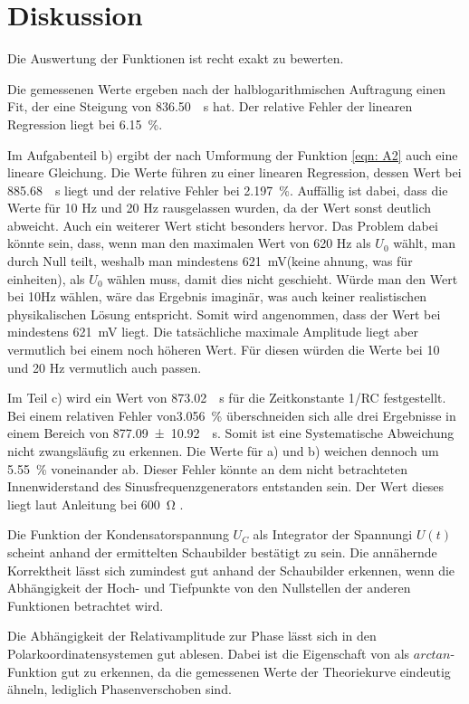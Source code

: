 \section{Diskussion}
\label{sec:Diskussion}

Die Auswertung der Funktionen ist recht exakt zu bewerten. %

Die gemessenen Werte ergeben nach der halblogarithmischen Auftragung einen Fit, der eine Steigung von 
\SI{836.50}{\per\second} hat. Der relative Fehler der linearen Regression liegt bei \SI{6.15}{\percent}. 

Im Aufgabenteil b) ergibt der nach Umformung der Funktion \eqref{eqn: A2}  auch eine lineare Gleichung.
Die Werte führen zu einer linearen Regression, dessen Wert bei \SI{885.68}{\per\second} liegt und der relative
Fehler bei \SI{2.197}{\percent}. Auffällig ist dabei, dass die Werte für 10 Hz und 20 Hz rausgelassen wurden,
da der Wert sonst deutlich abweicht. Auch ein weiterer Wert sticht besonders hervor. Das Problem dabei könnte sein,
dass, wenn man den maximalen Wert von 620 Hz als $U_{0}$ wählt, man durch Null teilt, weshalb man mindestens
\SI{621}{\milli\volt}(keine ahnung, was für einheiten), als $U_{0}$ wählen muss, damit dies nicht geschieht.
Würde man den Wert bei 10Hz wählen, wäre das Ergebnis imaginär, was auch keiner realistischen physikalischen
Lösung entspricht. Somit wird angenommen, dass der Wert bei mindestens \SI{621}{\milli\volt} liegt. Die tatsächliche
maximale Amplitude liegt aber vermutlich bei einem noch höheren Wert. Für diesen würden die Werte bei 10 und 20 Hz
vermutlich auch passen. 

Im Teil c) wird ein Wert von \SI{873.02}{\per\second} für die Zeitkonstante 1/RC festgestellt. Bei einem relativen
Fehler von\SI{3.056}{\percent} überschneiden sich alle drei Ergebnisse in einem Bereich von
\SI{877.09 \pm 10.92}{\per\second}. Somit ist eine Systematische Abweichung nicht zwangsläufig zu erkennen.
Die Werte für a) und b) weichen dennoch um \SI{5.55}{\percent} voneinander ab. Dieser Fehler könnte an dem nicht
betrachteten Innenwiderstand des Sinusfrequenzgenerators entstanden sein. Der Wert dieses liegt laut Anleitung bei
\SI{600}{\ohm} \cite{versuch}. 

Die Funktion der Kondensatorspannung $U_{C}$ als Integrator der Spannungi $U(t)$ scheint anhand der ermittelten
Schaubilder bestätigt zu sein. Die annähernde Korrektheit lässt sich zumindest gut anhand der Schaubilder erkennen,
wenn die Abhängigkeit der Hoch- und Tiefpunkte von den Nullstellen der anderen Funktionen betrachtet wird. 

Die Abhängigkeit der Relativamplitude zur Phase \phi lässt sich in den Polarkoordinatensystemen gut ablesen.
Dabei ist die Eigenschaft von \phi als $arctan$-Funktion gut zu erkennen, da die gemessenen Werte der Theoriekurve
eindeutig ähneln, lediglich Phasenverschoben sind. 

